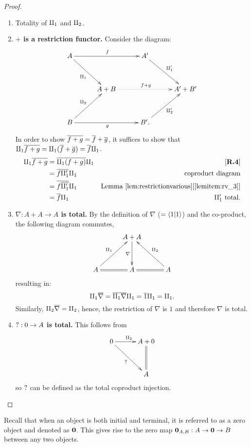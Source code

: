 \begin{proof}
  \prepprooflist
  \begin{enumerate}[{(}i{)}]
    \item Totality of $\amalg_{1}$ and $\amalg_{2}$.
    \item \textbf{$+$ is a restriction functor.}
      Consider the diagram:
      \[
        \xymatrix @C=30pt @R=35pt{
          A \ar[rr]^{f} \ar[dr]_{\cpa} && A' \ar[dr]^{\cpa'}\\
          &A+B \ar@{.>}[rr]^{f+g} & & A' + B'\\
          B \ar[rr]_{g} \ar[ur]^{\cpb} && B'. \ar[ur]_{\cpb'}
        }
      \]
      In order to show $\overline{f+g} = \overline{f} + \overline{g}$, it suffices to show that
      $\amalg_{1}\overline{f+g} = \amalg_{1}(\overline{f} + \overline{g}) = \overline{f}\amalg_{1}$.
      \begin{align*}
        \cpa\restr{f+g} &= \restr{\cpa(f+g)}\cpa & \rfour\\
        &= \restr{f \cpa'} \cpa &\text{coproduct diagram}\\
        &= \restr{f \restr{\cpa'}} \cpa
          & \text{Lemma }\refitem{lem:restrictionvarious}{lemitem:rv_3}\\
        &= \restr{f} \cpa & \cpa'\text{ total}.
      \end{align*}
    \item   \textbf{$\nabla:A+A\to A$ is total.}
      By the definition of $\nabla$ ($=\langle1 | 1 \rangle$) and the co-product, the following diagram
      commutes,
      \[
        \xymatrix @C=30pt @R=35pt{
          &A + A \ar[d]_{\nabla}\\
          A \ar@{=}[r] \ar[ur]^{\cpa}&A \ar@{=}[r] & A \ar[ul]_{\cpb}
        }
      \]
      resulting in:
      \[
         \amalg_{1} \overline{\nabla}  = \overline{\amalg_{1} \nabla} \amalg_{1} = \overline{1} \amalg_{1} = \amalg_{1}.
      \]
      Similarly, $\amalg_{2} \overline{\nabla} = \amalg_{2}$, hence, the restriction of $\nabla$ is $1$ and
      therefore $\nabla$ is total.
    \item  \textbf{$\mathbf{?}:0 \to A$ is total.}
      This follows from
      \[
        \xymatrix @C=30pt @R=35pt{
          0 \ar[dr]_{\why} \ar[r]^{\cpb} &A + 0 \\
          & A \ar@{=}[u]
        }
      \]
      so $\mathbf{?}$ can be defined as the total coproduct injection.
  \end{enumerate}



\end{proof}

Recall that when an object is both initial and terminal, it is referred to as a zero object and
denoted as $\mathbf{0}$. This gives rise to the zero map $\mathbf{0}_{A,B}: A \to \mathbf{0} \to B$ between any two objects.

